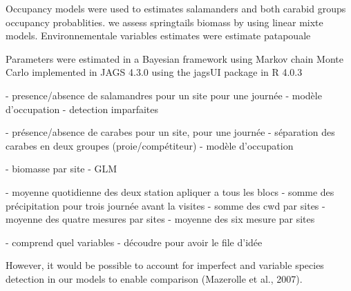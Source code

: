 Occupancy models were used to estimates salamanders and both carabid groups occupancy probablities. 
we assess springtails biomass by using linear mixte models.
Environnementale variables estimates were estimate patapouale









Parameters were estimated in a Bayesian framework using Markov chain Monte Carlo implemented in JAGS 4.3.0 using the jagsUI package in R 4.0.3 


- presence/absence de salamandres pour un site pour une journée 
- modèle d'occupation %
- detection imparfaites

- présence/absence de carabes pour un site, pour une journée 
- séparation des carabes en deux groupes (proie/compétiteur)
- modèle d'occupation

- biomasse par site
- GLM

- moyenne quotidienne des deux station apliquer a tous les blocs
- somme des précipitation pour trois journée avant la visites
- somme des cwd par sites
- moyenne des quatre mesures par sites
- moyenne des six mesure par sites


- comprend quel variables
- découdre pour avoir le file d'idée




However, it would be possible to account for imperfect and variable species detection in our models to enable comparison (Mazerolle et al., 2007).

